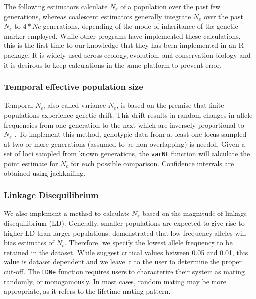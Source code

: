 \documentclass[english,titlepage]{article}
\begin{document}
The following estimators calculate $N_e$ of a population over the past few generations, whereas coalescent estimators generally integrate $N_e$ over the past $N_e$ to $4*Ne$ generations, depending of the mode of inheritance of the genetic marker employed. While other programs have implemented these calculations, this is the first time to our knowledge that they has been implemented in an R package. R is widely used across ecology, evolution, and conservation biology and it is desirous to keep calculations in the same platform to prevent error.

\subsubsection*{Temporal effective population size}

Temporal $N_e$, also called variance $N_e$, is based on the premise that finite populations experience genetic drift. This drift results in random changes in allele frequencies from one generation to the next which are inversely proportional to $N_e$ \citep{Nei1981}. To implement this method, genotypic data from at least one locus sampled at two or more generations (assumed to be non-overlapping) is needed.  Given a set of loci sampled from known generations, the \texttt{varNE} function will calculate the point estimate for $N_e$ for each possible comparison. Confidence intervals are obtained using jackknifing. 

\subsubsection*{Linkage Disequilibrium}

We also implement a method to calculate $N_e$ based on the magnitude of linkage disequilibrium (LD). Generally, smaller populations are expected to give rise to higher LD than larger populations. 
\cite{Waples2006} demonstrated that low frequency alleles will bias estimates of $N_e$. Therefore, we specify the lowest allele frequency to be retained in the dataset.  While \cite{Waples2008} suggest critical values between 0.05 and 0.01, this value is dataset dependent and we leave it to the user to determine the proper cut-off. The \texttt{LDNe} function requires users to characterize their system as mating randomly, or monogamously. In most cases, random mating may be more appropriate, as it refers to the lifetime mating pattern. 


  


\end{document}
